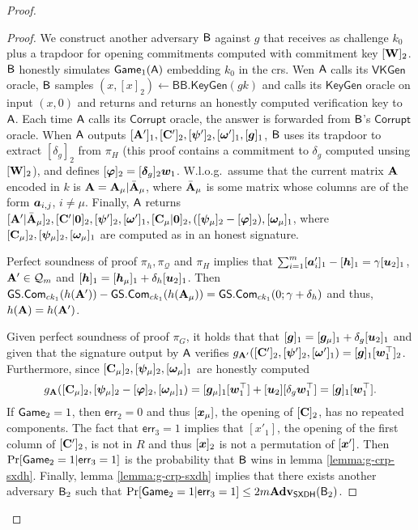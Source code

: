 \begin{proof}
\begin{proof}
We construct another adversary $\mathsf{B}$ against $g$ that receives as challenge $k_0$ plus a trapdoor for opening commitments computed with commitment key $[\mathbf{{W}}]_2$. $\mathsf{B}$ honestly simulates $\mathsf{Game}_1(\mathsf{A})$ embedding $k_0$ in the crs. Wen $\mathsf{A}$ calls its $\mathsf{VKGen}$ oracle, $\mathsf{B}$ samples $(x,[x]_2)\gets\mathsf{BB}.\mathsf{KeyGen}(gk)$ and calls its $\mathsf{KeyGen}$ oracle on input $(x,0)$ and returns and returns an honestly computed verification key to $\mathsf{A}$. Each time $\mathsf{A}$ calls its $\mathsf{Corrupt}$ oracle, the answer is forwarded from $\mathsf{B}$'s  $\mathsf{Corrupt}$ oracle.
When $\mathsf{A}$ outputs $[\mathbf{{A}}']_1,[\mathbf{{C}}']_2,[{\boldsymbol{\psi}}']_2,[{\boldsymbol{\omega}}']_1,[{\boldsymbol{g}}]_1$, $\mathsf{B}$ uses its trapdoor to extract $[\delta_g]_2$ from $\pi_H$ (this proof contains a commitment to $\delta_g$ computed unsing $[\mathbf{{W}}]_2$), and defines $[{\boldsymbol{\varphi}}]_2 = [{\boldsymbol{\delta}}_g]_2{\boldsymbol{w}}_1$.
W.l.o.g.~\allowbreak assume that the current matrix $\mathbf{{A}}$ encoded in $k$ is $\mathbf{{A}}=\mathbf{{A}}_\mu|\bar{\mathbf{{A}}}_\mu$, where $\bar{\mathbf{{A}}}_\mu$ is some matrix whose columns are of the form ${\boldsymbol{a}}_{i,j}$, $i\neq \mu$. Finally, $\mathsf{A}$ returns
$[\mathbf{{A}}'|\bar{\mathbf{{A}}}_\mu]_2,[\mathbf{{C}}'|\mathbf{{0}}]_2,[{\boldsymbol{\psi}}']_2,[{\boldsymbol{\omega}}']_1,[\mathbf{{C}}_\mu|\mathbf{{0}}]_2,([{\boldsymbol{\psi}}_\mu]_2-[{\boldsymbol{\varphi}}]_2),[{\boldsymbol{\omega}}_\mu]_1$, where $[\mathbf{{C}}_\mu]_2,[{\boldsymbol{\psi}}_\mu]_2,[{\boldsymbol{\omega}}_\mu]_1$ are computed as in an honest signature.

Perfect soundness of proof $\pi_h,\pi_{\mathcal{Q}}$ and $\pi_H$ implies that
$\sum_{i=1}^m[{\boldsymbol{a}}'_i]_1-[{\boldsymbol{h}}]_1=\gamma[{\boldsymbol{u}}_2]_1$, $\mathbf{{A}}'\in \mathcal{Q}_m$ and $[{\boldsymbol{h}}]_1 = [{\boldsymbol{h}}_\mu]_1 +\delta_h[{\boldsymbol{u}}_2]_1$. Then ${\mathsf{GS}}.\mathsf{Com}_{ck_1}(h(\mathbf{{A}}'))-{\mathsf{GS}}.\mathsf{Com}_{ck_1}(\allowbreak h(\mathbf{{A}}_\mu)) = {\mathsf{GS}}.\mathsf{Com}_{ck_1}(0;\gamma+\delta_h)$ and thus, $h(\mathbf{{A}})=h(\mathbf{{A}}')$.


Given perfect soundness of proof $\pi_G$, it holds that that $[{\boldsymbol{g}}]_1 = [{\boldsymbol{g}}_\mu]_1 +\delta_g[{\boldsymbol{u}}_2]_1$ and given that the signature output by $\mathsf{A}$ verifies $g_{\mathbf{{A}}'}([\mathbf{{C}}']_2,[{\boldsymbol{\psi}}']_2,[{\boldsymbol{\omega}}']_1) = [{\boldsymbol{g}}]_1[{\boldsymbol{w}}_1^\top]_2$. Furthermore, since $[\mathbf{{C}}_\mu]_2,[{\boldsymbol{\psi}}_\mu]_2,[{\boldsymbol{\omega}}_\mu]_1$ are honestly computed
$$
g_{\mathbf{{A}}}([\mathbf{{C}}_\mu]_2,[{\boldsymbol{\psi}}_\mu]_2-[{\boldsymbol{\varphi}}]_2,[{\boldsymbol{\omega}}_\mu]_1) = [{\boldsymbol{g}}_\mu]_1[{\boldsymbol{w}}_1^\top] + [{\boldsymbol{u}}_2][\delta_g{\boldsymbol{w}}_1^\top] = [{\boldsymbol{g}}]_1[{\boldsymbol{w}}_1^\top].
$$
If $\mathsf{Game}_2=1$, then $\mathsf{err}_2=0$ and thus $[{\boldsymbol{x}}_\mu]$, the opening of $[\mathbf{{C}}]_2$, has no repeated components. The fact that $\mathsf{err}_3=1$ implies that $[x'_1]$, the opening of the first column of $[\mathbf{{C}}']_2$, is not in $R$ and thus $[{\boldsymbol{x}}]_2$ is not a permutation of $[{\boldsymbol{x}}']$.  Then $\Pr[\mathsf{Game}_2=1|\mathsf{err}_3=1]$ is the probability that $\mathsf{B}$ wins in lemma \ref{lemma:g-crp-sxdh}.
Finally, lemma  \ref{lemma:g-crp-sxdh} implies that there exists another adversary $\mathsf{B}_2$ such that $\Pr[\mathsf{Game}_2=1|\mathsf{err}_3=1]\leq 2m\mathbf{Adv}_\mathsf{SXDH}(\mathsf{B}_2)$.
\end{proof}


\end{proof}

